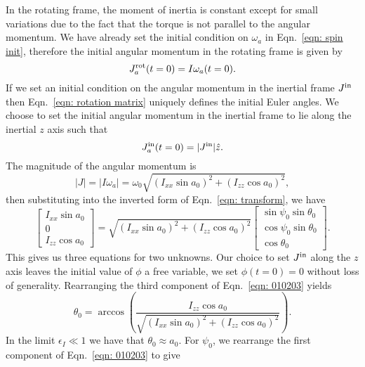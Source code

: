 \documentclass[../full_thesis/full_thesis.tex]{subfiles}
\begin{document}
In the rotating frame, the moment of inertia is constant except for small variations
due to the fact that the torque is not parallel to the angular momentum.
We have already set the initial condition on $\omega_a$ in Eqn.~\eqref{eqn:
spin init}, therefore the initial angular momentum in the rotating frame is given by
\begin{equation}
  J^{\textrm{rot}}_a(t=0) = I \omega_a(t=0).
\end{equation}
If we set an initial condition on the angular momentum in the inertial frame
$J^{\textrm{in}}$ then Eqn.~\eqref{eqn: rotation matrix} uniquely defines the initial
Euler angles. We choose to set the initial angular momentum in the inertial
frame to lie along the inertial $z$ axis such that
\begin{equation}
  J^{\textrm{in}}_a(t=0) = |J^{\textrm{in}}| \hat{z}.
\end{equation}
The magnitude of the angular momentum is
\begin{equation}
|J| = |I \omega_{a}|=\omega_{0}\sqrt{(I_{xx}\sin a_{0})^{2} + (I_{zz}\cos a_{0})^{2}},
\end{equation}
then substituting into the inverted form of Eqn.~\eqref{eqn: transform}, we have
\begin{equation}
\left[ \begin{array}{c}
I_{xx}\sin a_{0} \\
0 \\
I_{zz} \cos a_{0}
\end{array}\right] =
\sqrt{(I_{xx}\sin a_{0})^{2} + (I_{zz}\cos a_{0})^{2}}
\left[ \begin{array}{c}
\sin \psi_{0} \sin \theta_{0} \\
\cos \psi_{0} \sin \theta_{0} \\
\cos \theta_{0}
\end{array}\right].
\label{eqn: 010203}
\end{equation}
This gives us three equations for two unknowns. Our choice to set $J^{\textrm{in}}$ along
the $z$ axis leaves the initial value of $\phi$ a free variable,
we set $\phi(t=0) = 0$ without loss of generality.
Rearranging the third component of Eqn.~\eqref{eqn: 010203} yields
\begin{equation}
\theta_{0} = \arccos\left(\frac{I_{zz}\cos a_{0}}{ \sqrt{(I_{xx}\sin
        a_{0})^{2} + (I_{zz}\cos a_{0})^{2}}} \right).
\label{eqn: theta init}
\end{equation}
In the limit $\epsilon_{I} \ll 1$ we have that $\theta_{0} \approx a_{0}$.
For $\psi_0$, we rearrange the first component of Eqn.~\eqref{eqn: 010203} to
give
\end{document}
